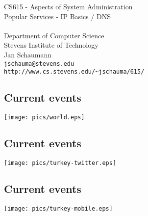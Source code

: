 \documentclass[xga]{xdvislides}
\begin{document}
\setfontphv

\lhead{\slidetitle}                               %
\cfoot{\relax}                               %
\rfoot{\Gray{\today}}

\vspace*{\fill}
\begin{center}
	\Hugesize
		CS615 - Aspects of System Administration\\ [1em]
		Popular Services - IP Basics / DNS\\ [1em]
	\hspace*{5mm}\blueline\\ [1em]
	\Normalsize
		Department of Computer Science\\
		Stevens Institute of Technology\\
		Jan Schaumann\\
		\verb+jschauma@stevens.edu+ \\
		\verb+http://www.cs.stevens.edu/~jschauma/615/+
\end{center}
\vspace*{\fill}

\subsection{Current events}
\vspace*{\fill}
\begin{center}
	\texttt{[image: pics/world.eps]} \\
\end{center}
\vspace*{\fill}

\subsection{Current events}
\vspace*{\fill}
\begin{center}
	\texttt{[image: pics/turkey-twitter.eps]} \\
\end{center}
\vspace*{\fill}

\subsection{Current events}
\vspace*{\fill}
\begin{center}
	\texttt{[image: pics/turkey-mobile.eps]} \\
\end{center}
\vspace*{\fill}
\end{document}
